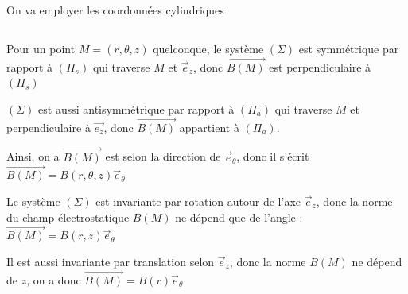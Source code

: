 \documentclass[a4paper,12pt]{book}
\begin{document}
On va employer les coordonnées cylindriques
\subsection{}
Pour un point $M=(r,\theta,z)$ quelconque, le système $(\Sigma)$ est symmétrique par rapport à $(\Pi_s)$ qui traverse $M$ et $\vec{e}_z$, donc $\overrightarrow{B(M)}$ est perpendiculaire à $(\Pi_s)$

$(\Sigma)$ est aussi antisymmétrique par rapport à $(\Pi_a)$ qui traverse $M$ et perpendiculaire à $\vec{e_z}$, donc $\overrightarrow{B(M)}$ appartient à $(\Pi_a)$. 

Ainsi, on a $\overrightarrow{B(M)}$ est selon la direction de $\vec{e}_\theta$, donc il s'écrit $\overrightarrow{B(M)}=B(r,\theta,z)\vec{e}_\theta$

Le système $(\Sigma)$ est invariante par rotation autour de l'axe $\vec{e}_z$, donc la norme du champ électrostatique $B(M)$ ne dépend que de l'angle : $\overrightarrow{B(M)}=B(r,z)\vec{e}_\theta$

Il est aussi invariante par translation selon $\vec{e}_z$, donc la norme $B(M)$ ne dépend de $z$, on a donc $\overrightarrow{B(M)}=B(r)\vec{e}_\theta$
\end{document}
